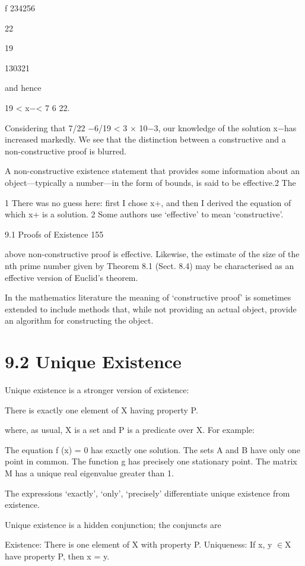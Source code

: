 \documentclass[11pt]{article}
\theoremstyle{plain}
\theoremstyle{definition}
\begin{document}
f 234256

22

19

130321

and hence

19 < x$-$< 7 6 22.

Considering that 7/22 $-$6/19 < 3 $\times$ 10$-$3, our knowledge of the solution x$-$has increased markedly. We see that the distinction between a constructive and a non-constructive proof is blurred.

A non-constructive existence statement that provides some information about an object---typically a number---in the form of bounds, is said to be effective.2 The

1 There was no guess here: first I chose x+, and then I derived the equation of which x+ is a solution. 2 Some authors use `effective' to mean `constructive'.

9.1 Proofs of Existence 155

above non-constructive proof is effective. Likewise, the estimate of the size of the nth prime number given by Theorem 8.1 (Sect. 8.4) may be characterised as an effective version of Euclid's theorem.

In the mathematics literature the meaning of `constructive proof' is sometimes extended to include methods that, while not providing an actual object, provide an algorithm for constructing the object.

\section{9.2 Unique Existence}

Unique existence is a stronger version of existence:

There is exactly one element of X having property P.

where, as usual, X is a set and P is a predicate over X. For example:

The equation f (x) = 0 has exactly one solution. The sets A and B have only one point in common. The function g has precisely one stationary point. The matrix M has a unique real eigenvalue greater than 1.

The expressions `exactly', `only', `precisely' differentiate unique existence from existence.

Unique existence is a hidden conjunction; the conjuncts are

Existence: There is one element of X with property P. Uniqueness: If x, y $\in$X have property P, then x = y.
\end{document}
